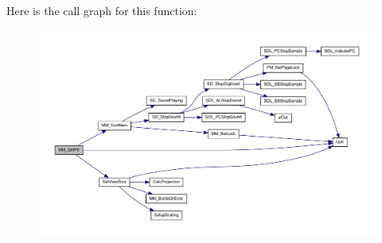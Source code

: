 Here is the call graph for this function:
\nopagebreak
\begin{figure}[H]
\begin{center}
\leavevmode
\includegraphics[width=400pt]{ID__MM_8C_ab70f353278bae916507eb350c39f4ebb_cgraph}
\end{center}
\end{figure}




